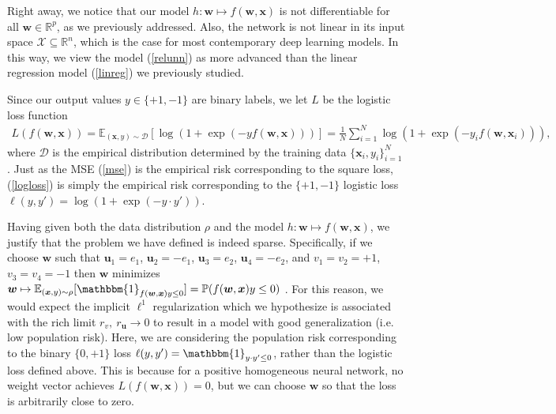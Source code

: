 \documentclass{article}
\begin{document}
Right away, we notice that our model $h: \boldsymbol{w} \mapsto f(\boldsymbol{w}, \boldsymbol{x})$ is not differentiable for all $\boldsymbol{w} \in \mathbb{R}^p$, as we previously addressed. Also, the network is not linear in its input space $\mathcal{X} \subseteq \mathbb{R}^n$, which is the case for most contemporary deep learning models. In this way, we view the model (\ref{relunn}) as more advanced than the linear regression model (\ref{linreg}) we previously studied.

Since our output values $y \in \{+1, -1\}$ are binary labels, we let $L$ be the logistic loss function
\begin{align}\label{logloss}
    L(f(\boldsymbol{w}, \boldsymbol{x})) = \mathbb{E}_{(\boldsymbol{x}, y) \sim \mathcal{D}} \left[\log \left( 1 + \exp(-y f(\boldsymbol{w}, \boldsymbol{x})) \right) \right] = \frac{1}{N} \sum_{i=1}^N \log \left( 1 + \exp(-y_i f(\boldsymbol{w}, \boldsymbol{x}_i)) \right),
\end{align}
where $\mathcal{D}$ is the empirical distribution determined by the training data $\{ \boldsymbol{x}_i, y_i \}_{i=1}^N$ \cite{wei2019regularization}. Just as the MSE (\ref{mse}) is the empirical risk corresponding to the square loss, (\ref{logloss}) is simply the empirical risk corresponding to the $\{+1, -1\}$ logistic loss $\ell(y, y') = \log( 1 + \exp(-y \cdot y'))$. 

Having given both the data distribution $\rho$ and the model $h: \boldsymbol{w} \mapsto f(\boldsymbol{w}, \boldsymbol{x})$, we justify that the problem we have defined is indeed sparse. Specifically, if we choose $\boldsymbol{w}$ such that $\boldsymbol{u}_1 = e_1$, $\boldsymbol{u}_2 = -e_1$, $\boldsymbol{u}_3 = e_2$, $\boldsymbol{u}_4 = -e_2$, and $v_1 = v_2 = +1$, $v_3 = v_4 = -1$ then $\boldsymbol{w}$ minimizes $\boldsymbol{w} \mapsto \mathbb{E}_{(\boldsymbol{x}, y) \sim \rho} [\mathbbm{1}_{f(\boldsymbol{w}, \boldsymbol{x})y \leq 0}] = \mathbb{P}(f(\boldsymbol{w}, \boldsymbol{x})y \leq 0)$ \cite{wei2019regularization}. For this reason, we would expect the implicit $\ell^1$ regularization which we hypothesize is associated with the rich limit $r_v, \ r_{\boldsymbol{u}} \rightarrow 0$ to result in a model with good generalization (i.e. low population risk). Here, we are considering the population risk corresponding to the binary $\{0, +1\}$ loss $\ell(y, y') = \mathbbm{1}_{y \cdot y' \leq 0}$, rather than the logistic loss defined above. This is because for a positive homogeneous neural network, no weight vector achieves $L(f(\boldsymbol{w}, \boldsymbol{x})) = 0$, but we can choose $\boldsymbol{w}$ so that the loss is arbitrarily close to zero.
\end{document}
